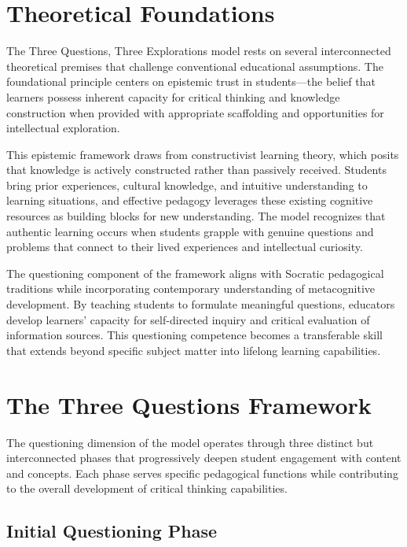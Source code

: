 \documentclass[
  Letterpaper,
]{scrbook}
\begin{document}
\section{Theoretical Foundations}\label{theoretical-foundations}

The Three Questions, Three Explorations model rests on several
interconnected theoretical premises that challenge conventional
educational assumptions. The foundational principle centers on epistemic
trust in students---the belief that learners possess inherent capacity
for critical thinking and knowledge construction when provided with
appropriate scaffolding and opportunities for intellectual exploration.

This epistemic framework draws from constructivist learning theory,
which posits that knowledge is actively constructed rather than
passively received. Students bring prior experiences, cultural
knowledge, and intuitive understanding to learning situations, and
effective pedagogy leverages these existing cognitive resources as
building blocks for new understanding. The model recognizes that
authentic learning occurs when students grapple with genuine questions
and problems that connect to their lived experiences and intellectual
curiosity.

The questioning component of the framework aligns with Socratic
pedagogical traditions while incorporating contemporary understanding of
metacognitive development. By teaching students to formulate meaningful
questions, educators develop learners' capacity for self-directed
inquiry and critical evaluation of information sources. This questioning
competence becomes a transferable skill that extends beyond specific
subject matter into lifelong learning capabilities.

\section{The Three Questions
Framework}\label{the-three-questions-framework}

The questioning dimension of the model operates through three distinct
but interconnected phases that progressively deepen student engagement
with content and concepts. Each phase serves specific pedagogical
functions while contributing to the overall development of critical
thinking capabilities.

\subsection{Initial Questioning Phase}\label{initial-questioning-phase}
\end{document}
